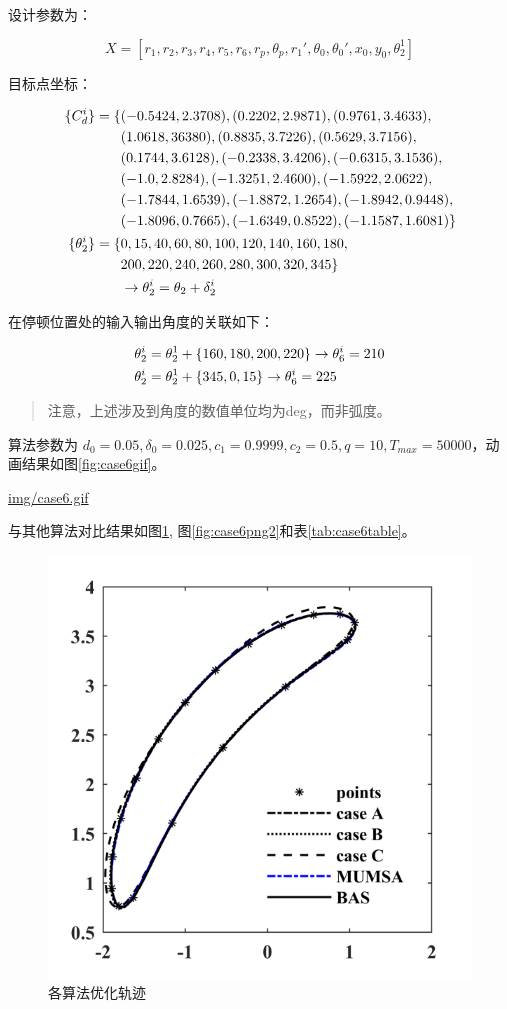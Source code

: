 \documentclass[]{ctexbook}
\theoremstyle{definition}
\theoremstyle{definition}
\theoremstyle{definition}
\theoremstyle{remark}
\begin{document}
设计参数为：

\[
X = [r_1,r_2,r_3,r_4,r_5,r_6,r_p,\theta_p,r_1',\theta_0,\theta_0',x_0,y_0,\theta_2^1] 
\]

目标点坐标：

\begin{align}
\{C_d^i\} = \{&(-0.5424,2.3708),(0.2202,2.9871),(0.9761,3.4633), \notag \\
&(1.0618,36380),(0.8835,3.7226),(0.5629,3.7156),\notag \\
&(0.1744,3.6128),(-0.2338,3.4206),(-0.6315,3.1536), \notag \\
&(-1.0,2.8284),(-1.3251,2.4600),(-1.5922,2.0622), \notag \\
&(-1.7844,1.6539),(-1.8872,1.2654),(-1.8942,0.9448), \notag \\
&(-1.8096,0.7665),(-1.6349,0.8522),(-1.1587,1.6081)\} \notag \\
\{\theta_2^i\} = \{&0,15,40,60,80,100,120,140,160,180,\notag \\
& 200, 220,240,260,280,300,320,345\} \notag \\
& \rightarrow \theta_2^i = \theta_2 + \delta_2^i \notag \\
\end{align}

在停顿位置处的输入输出角度的关联如下：

\begin{align}
&\theta_2^i = \theta_2^1+\{160,180,200,220\}\rightarrow \theta_6^i=210 \notag \\
&\theta_2^i=\theta_2^1+\{345,0,15\} \rightarrow \theta_6^i = 225 \notag \\
\end{align}

\begin{quote}
注意，上述涉及到角度的数值单位均为deg，而非弧度。
\end{quote}

算法参数为
\(d_0 = 0.05,\delta_0=0.025,c_1=0.9999,c_2=0.5,q=10,T_{max}=50000\)，动画结果如图\ref{fig:case6gif}。

\url{img/case6.gif}

与其他算法对比结果如图\ref{fig:case6png},
图\ref{fig:case6png2}和表\ref{tab:case6table}。

\begin{figure}

{\centering \includegraphics[width=0.5\linewidth]{img/case6png} 

}

\caption{各算法优化轨迹}\label{fig:case6png}
\end{figure}
\end{document}
